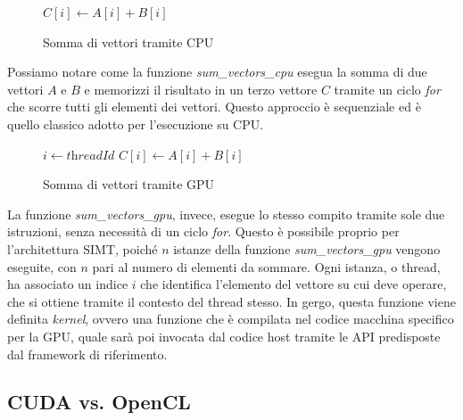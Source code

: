 \begin{figure}[h!]
  \vspace{1em}
  \begin{algorithm}
    [H]
    \caption{Somma di vettori tramite CPU}
    \label{alg:sumvectorscpu}
    \begin{algorithmic}
        \State
      $C[i] \gets A[i] + B[i]$ \EndFor \EndFunction
    \end{algorithmic}
  \end{algorithm}
  \vspace{1em}
\end{figure}

Possiamo notare come la funzione \textit{sum\_vectors\_cpu} esegua la somma di due
vettori $A$ e $B$ e memorizzi il risultato in un terzo vettore $C$ tramite un ciclo
\textit{for} che scorre tutti gli elementi dei vettori. Questo approccio è sequenziale
ed è quello classico adotto per l'esecuzione su CPU.

\begin{figure}[h!]
  \vspace{1em}
  \begin{algorithm}
    [H]
    \caption{Somma di vettori tramite GPU}
    \label{alg:sumvectorsgpu}
    \begin{algorithmic}
       \State $i \gets \textit{threadId}$ \State
      $C[i] \gets A[i] + B[i]$ \EndFunction
    \end{algorithmic}
  \end{algorithm}
  \vspace{1em}
\end{figure}

La funzione \textit{sum\_vectors\_gpu}, invece, esegue lo stesso compito tramite
sole due istruzioni, senza necessità di un ciclo \textit{for}. Questo è
possibile proprio per l'architettura SIMT, poiché $n$ istanze della funzione \textit{sum\_vectors\_gpu}
vengono eseguite, con $n$ pari al numero di elementi da sommare. Ogni istanza, o
thread, ha associato un indice $i$ che identifica l'elemento del vettore su cui
deve operare, che si ottiene tramite il contesto del thread stesso. In gergo, questa
funzione viene definita \textit{kernel}, ovvero una funzione che è compilata nel
codice macchina specifico per la GPU, quale sarà poi invocata dal codice host
tramite le API predisposte dal framework di riferimento.

\subsection{CUDA vs. OpenCL}
\label{subsec:cudavsopencl}

